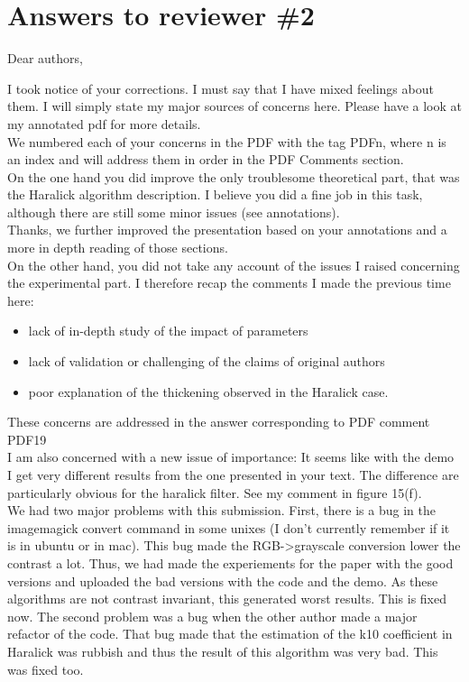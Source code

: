 \documentclass[a4paper,10pt]{report}
\begin{document}
\chapter{Answers to reviewer \#2}

Dear authors,

\que I took notice of your corrections. I must say that I have mixed feelings
about them. I will simply state my major sources of concerns here. Please
have a look at my annotated pdf for more details.\\
\ans We numbered each of your concerns in the PDF with the tag PDFn, where n is an index and will address them in order in the PDF Comments section.\\

\que On the one hand you did improve the only troublesome theoretical part, that
was  the Haralick algorithm description. I believe you did a fine job in
this task, although there are still some minor issues (see annotations).\\

\ans Thanks, we further improved the presentation based on your annotations and a more in depth reading of those sections.\\

\que On the other hand, you did not take any account of the issues I raised
concerning the experimental part. I therefore recap the comments I made the
previous time here:

\begin{itemize}

\item lack of in-depth study of the impact of parameters

\item lack of validation or challenging of the claims of original authors

\item  poor explanation of the thickening observed in the Haralick case.
\end{itemize} 

\ans These concerns are addressed  in the answer corresponding to PDF comment PDF19\\

\que
I am also concerned with a new issue of importance: It seems like with the
demo I get very different results  from the one presented in your text. The
difference are particularly obvious for the haralick filter. See my comment
in figure 15(f).\\

\ans We had two major problems with this submission. First, there is a bug in the imagemagick convert command in some unixes (I don't currently remember if it is in ubuntu or in mac). This bug made the RGB->grayscale conversion lower the contrast a lot. Thus, we had made the experiements for the paper with the good versions and uploaded the bad versions with the code and the demo. As these algorithms are not contrast invariant, this generated worst results. This is fixed now. The second problem was a bug when the other author made a major refactor of the code. That bug made that the estimation of the k10 coefficient in Haralick was rubbish and thus the result of this algorithm was very bad. This was fixed too.\\
\end{document}
